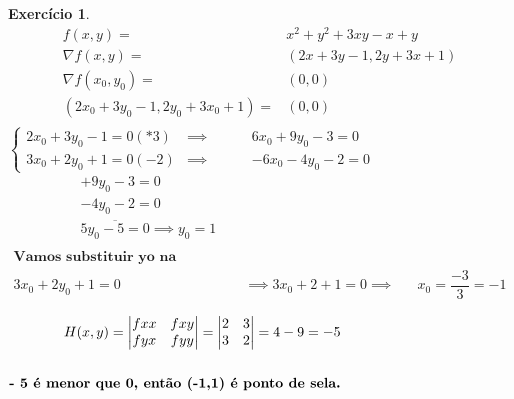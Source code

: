 \documentclass{article}
\newtheorem{ex}{Exercício}
\begin{document}
\begin{ex}
\begin{eqnarray*}
f(x,y)=& x^2\! +y^2\!+3xy\! -x\! + y\\
\nabla f(x,y)=& (2x\! + 3y\! -1\!,2y\! +3x\!+1)\\
\nabla f(x_{0},y_{0})=& (0,0)\\
(2x_{0}\! +3y_{0}\! -1\!,2y_{0}\! +3x_{0}\! +1) =&(0,0)\\
\end{eqnarray*}
$\left\{
\begin{aligned}
2x_{0}\! +3y_{0}\! -1\!= 0 (*3) & \implies
\hspace{1cm}&6x_{0}\! +9y_{0}\!-3\!=0\\
3x_{0}\! +2y_{0}\! +1\! =0 (-2) & \implies
\hspace{1cm}&-6x_{0}\! - 4y_{0}\! -2\!=0 
\end{aligned}\right.$
$\begin{aligned}
&&\hspace{1cm}&+9y_{0}\! -3\!=0\\
&&\hspace{1cm}&- 4y_{0}\! -2\!=0\\
&&&\overline{5y_{0}\! -5\!=0} \implies {y_{0}\!=1}
\end{aligned}$
\\
$\begin{aligned}
\\
\textbf{Vamos substituir yo na equação:} \\
    3x_{0}\! +2y_{0}\! +1\! =0  & \implies 3x_{0}\! +2\! +1\! =0\implies
    && x_{0}\!=\dfrac{-3}{3} \! = -1
\end{aligned}$
\vspace{1cm}
\begin{center}
$\begin{aligned}
    H(x,y)= \begin{vmatrix}
    fxx & fxy\\
    fyx & fyy
\end{vmatrix} = 
\begin{vmatrix}
    2 & 3\\
    3 & 2
\end{vmatrix} = 4-9 = -5 \\
\\
\vspace{1cm}
\textbf{- 5 é menor que 0, então (-1,1) é ponto de sela.}\textbf{}
\vspace{1cm}
\end{aligned}$
\end{center}
\vspace{1cm}
\end{ex}
\end{document}
